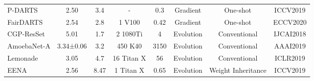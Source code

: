 \documentclass[sigconf]{acmart}
\begin{document}
\begin{table*}[!th]
\begin{tabular}{l|c|c|c|c|c|c|c}
P-DARTS \cite{Ref:52}                                       & 2.50                                                                                        & 3.4                                                           & -                                & 0.3                                                                       & Gradient                                  & One-shot  &ICCV2019                                     \\
FairDARTS \cite{Ref:35}                                       & 2.54                                                                                        & 2.8                                                           & 1 V100                                & 0.42                                                                       & Gradient                                  & One-shot   &ECCV2020                                    \\
CGP-ResSet \cite{Ref:59}                               & 5.01                                                                                    & 1.7                                                           & 2 1080Ti                          & 4                                                                      & Evolution                                  & Conventional         &IJCAI2018                          \\
AmoebaNet-A \cite{Ref:08}                               & 3.34±0.06                                                                                  & 3.2                                                           & 450 K40                          & 3150                                                                      & Evolution                                  & Conventional         &AAAI2019                          \\
Lemonade \cite{Ref:60}                               & 3.05                                                                                   & 4.7                                                           & 16 Titan X                          & 56                                                                      & Evolution                                  & Conventional         &ICLR2019                          \\
EENA \cite{Ref:51}                               & 2.56                                                                                   & 8.47                                                           & 1 Titan X                          & 0.65                                                                      & Evolution                                  & Weight Inheritance         &ICCV2019                          \\

\end{tabular}
\end{table*}
\end{document}
